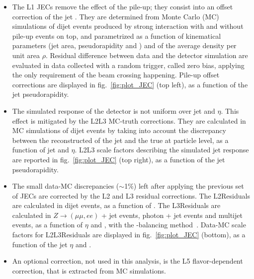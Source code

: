\begin{itemize}
\item The L1 JECs remove the effect of the pile-up; they consist into an offset correction of the jet \pt. They are determined from Monte Carlo (MC) simulations of dijet events produced by strong interaction with and without pile-up events on top, and parametrized as a function of kinematical parameters (jet area, pseudorapidity and \pt) and of the average \pt density per unit area $\rho$. Residual difference between data and the detector simulation are evaluated in data collected with a random trigger, called zero bias, applying the only requirement of the beam crossing happening. Pile-up offset corrections are displayed in fig.~\ref{fig:plot_JEC} (top left), as a function of the jet pseudorapidity.
\item The simulated response of the detector is not uniform over jet \pt and $\eta$. This effect is mitigated by the L2L3 MC-truth corrections. They are calculated in MC simulations of dijet events by taking into account the discrepancy between the reconstructed \pt of the jet and the true \pt at particle level, as a function of jet \pt and $\eta$. L2L3 scale factors describing the simulated jet response are reported in fig.~\ref{fig:plot_JEC} (top right), as a function of the jet pseudorapidity.
\item The small data-MC discrepancies ($\sim$1\%) left after applying the previous set of JECs are corrected by the L2 and L3 residual corrections. The L2Residuals are calculated in dijet events, as a function of \pt. The L3Residuals are calculated in $Z \rightarrow (\mu \mu, ee)$ + jet events, photon + jet events and multijet events, as a function of $\eta$ and \pt, with the \pt-balancing method~\cite{bib:1748-0221-6-11-P11002}. Data-MC scale factors for L2L3Residuals are displayed in fig.~\ref{fig:plot_JEC} (bottom), as a function of the jet $\eta$ and \pt.
\item An optional correction, not used in this analysis, is the L5 flavor-dependent correction, that is extracted from MC simulations.
\end{itemize}

